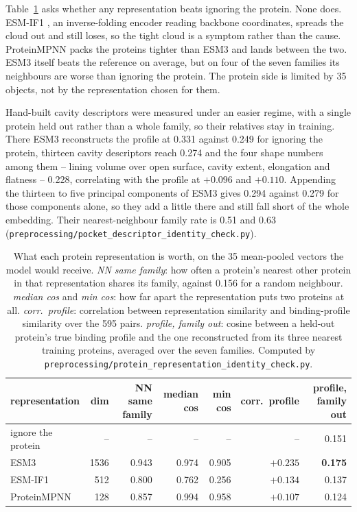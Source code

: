 Table~\ref{tab:proteinrepr} asks whether any representation beats ignoring the protein. None does.
ESM-IF1 \cite{esmif}, an inverse-folding encoder reading backbone coordinates, spreads the cloud
out and still loses, so the tight cloud is a symptom rather than the cause. ProteinMPNN
\cite{proteinmpnn} packs the proteins tighter than ESM3 and lands between the two. ESM3 itself
beats the reference on average, but on four of the seven families its neighbours are worse than
ignoring the protein. The protein side is limited by 35 objects, not by the representation chosen
for them.

Hand-built cavity descriptors were measured under an easier regime, with a single protein held out
rather than a whole family, so their relatives stay in training. There ESM3 reconstructs the
profile at 0.331 against 0.249 for ignoring the protein, thirteen cavity descriptors reach 0.274
and the four shape numbers among them -- lining volume over open surface, cavity extent,
elongation and flatness -- 0.228, correlating with the profile at $+0.096$ and $+0.110$. Appending
the thirteen to five principal components of ESM3 gives 0.294 against 0.279 for those components
alone, so they add a little there and still fall short of the whole embedding. Their
nearest-neighbour family rate is 0.51 and 0.63
(\texttt{preprocessing/pocket\_descriptor\_identity\_check.py}).

\begin{table}[htbp]
\centering
\begin{tabular}{lrrrrrr}
\hline
representation & dim & NN same family & median cos & min cos & corr.\ profile & profile, family out \\
\hline
ignore the protein & -- & -- & -- & -- & -- & 0.151 \\
ESM3 & 1536 & 0.943 & 0.974 & 0.905 & $+0.235$ & \textbf{0.175} \\
ESM-IF1 & 512 & 0.800 & 0.762 & 0.256 & $+0.134$ & 0.137 \\
ProteinMPNN & 128 & 0.857 & 0.994 & 0.958 & $+0.107$ & 0.124 \\
\hline
\end{tabular}
\caption{What each protein representation is worth, on the 35 mean-pooled vectors the model would
receive. \emph{NN same family}: how often a protein's nearest other protein in that representation
shares its family, against 0.156 for a random neighbour. \emph{median cos} and \emph{min cos}: how
far apart the representation puts two proteins at all. \emph{corr.\ profile}: correlation between
representation similarity and binding-profile similarity over the 595 pairs. \emph{profile, family
out}: cosine between a held-out protein's true binding profile and the one reconstructed from its
three nearest training proteins, averaged over the seven families. Computed by
\texttt{preprocessing/protein\_representation\_identity\_check.py}.}
\label{tab:proteinrepr}
\end{table}

